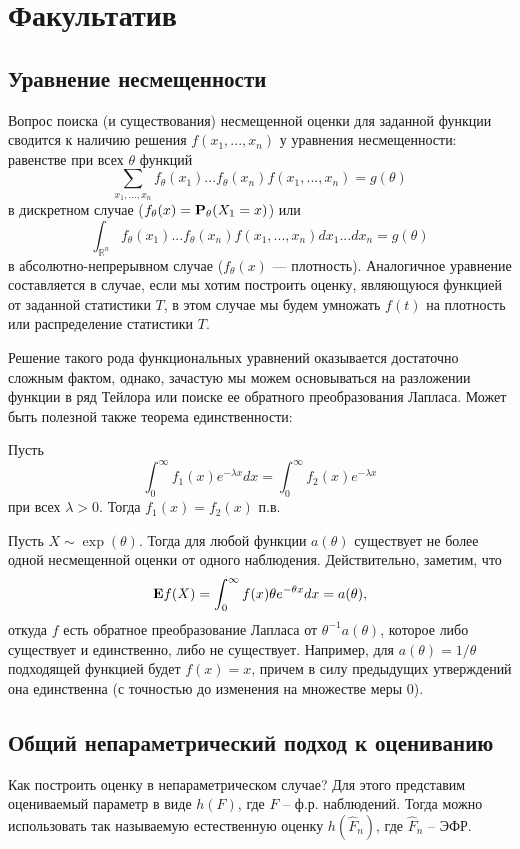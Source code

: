 \documentclass[10 pt,russian]{report}
\begin{document}
\section{Факультатив}
\subsection{Уравнение несмещенности}
Вопрос поиска (и существования) несмещенной оценки для заданной функции сводится к наличию решения $f(x_1,...,x_n)$ у уравнения несмещенности: равенстве при всех $\theta$ функций
$$
\sum_{x_1,...,x_n} f_{\theta}(x_1)...f_{\theta}(x_n) f(x_1,...,x_n) = g(\theta)$$
в дискретном случае ($f_{\theta}(x) = {\bf P}_{\theta}(X_1=x)$) или
$$
\int_{\mathbb{R}^n} f_{\theta}(x_1)...f_{\theta}(x_n) f(x_1,...,x_n) dx_1 ... dx_n = g(\theta)
$$
в абсолютно-непрерывном случае ($f_{\theta}(x)$ --- плотность). Аналогичное уравнение составляется в случае, если мы хотим построить оценку, являющуюся функцией от заданной статистики $T$, в этом случае мы будем умножать $f(t)$ на плотность или распределение статистики $T$.

Решение такого рода функциональных уравнений оказывается достаточно сложным фактом, однако, зачастую мы можем основываться на разложении функции в ряд Тейлора или поиске ее обратного преобразования Лапласа. Может быть полезной также теорема единственности:
\begin{Th}
Пусть 
$$
\int_{0}^{\infty} f_1(x) e^{-\lambda x} dx = \int_0^{\infty} f_2(x) e^{-\lambda x}
$$
при всех $\lambda>0$. Тогда $f_1(x)=f_2(x)$ п.в.
\end{Th}
\Exam Пусть $X\sim \exp(\theta)$. Тогда для любой функции $a(\theta)$ существует не более одной несмещенной оценки от одного наблюдения. Действительно, заметим, что
$$
{\bf E}f(X) = \int_0^{\infty} f(x) \theta e^{-\theta x} dx = a(\theta), 
$$
откуда $f$ есть обратное преобразование Лапласа от $\theta^{-1} a(\theta)$, которое либо существует и единственно, либо не существует. Например, для $a(\theta)=1/\theta$ подходящей функцией будет $f(x)=x$, причем в силу предыдущих утверждений она единственна (с точностью до изменения на множестве меры 0).
\subsection{Общий непараметрический подход к оцениванию}
Как построить оценку в непараметрическом случае? Для этого представим оцениваемый параметр в виде $h(F)$, где $F$ -- ф.р. наблюдений. Тогда можно использовать так называемую естественную оценку $h(\widehat{F}_n)$, где $\widehat{F}_n$ -- ЭФР. 
\end{document}
